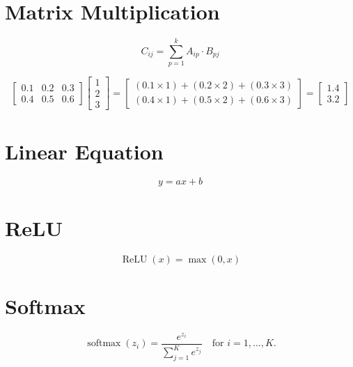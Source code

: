 \documentclass[12pt]{article}
\DeclareMathOperator{\relu}{ReLU}
\DeclareMathOperator{\softmax}{softmax}
\newcommand{\SectionTitle}[1]{\section*{\centering #1}\bigskip}
\begin{document}
\clearpage

\SectionTitle{Matrix Multiplication}

\[
C_{ij} = \sum_{p=1}^{k} A_{ip} \cdot B_{pj}
\]

\[
\begin{bmatrix}
0.1 & 0.2 & 0.3 \\
0.4 & 0.5 & 0.6
\end{bmatrix}
\begin{bmatrix}
1 \\
2 \\
3
\end{bmatrix}
=
\begin{bmatrix}
(0.1 \times 1) + (0.2 \times 2) + (0.3 \times 3) \\
(0.4 \times 1) + (0.5 \times 2) + (0.6 \times 3)
\end{bmatrix}
=
\begin{bmatrix}
1.4 \\
3.2
\end{bmatrix}
\]

\clearpage

\SectionTitle{Linear Equation}

\[
y = ax + b
\]

\bigskip

\begin{center}
\end{center}

\clearpage

\SectionTitle{ReLU}

\[
\relu(x) = \max(0, x)
\]

\bigskip

\begin{center}
\end{center}

\clearpage

\SectionTitle{Softmax}

\[
\softmax(z_i) = \frac{e^{z_i}}{\sum_{j=1}^{K} e^{z_j}} \quad \text{for } i=1,\dots,K.
\]
\end{document}

